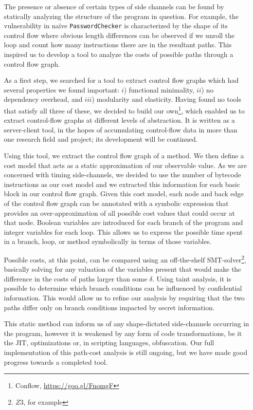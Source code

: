 The presence or absence of certain types of side channels can be found by 
statically analyzing the structure of the program in question. For example, the vulnerability in na\"ive \texttt{PasswordChecker} is characterized by the shape of its control flow where obvious length
differences can be observed if we unroll the loop and count how many instructions there are in the resultant
paths. This inspired us to develop a tool to analyze the costs of possible paths through a control flow graph. 

As a first step, we searched for a tool to extract control flow graphs which had several properties we found important: $i$) functional minimality, $ii$) no dependency overhead, and $iii$) modularity and elasticity. Having found no tools that satisfy all three of these, we decided to build our own\footnote{Conflow, \href{https://goo.gl/FnomgF}{https://goo.gl/FnomgF}}, which enabled us to extract control-flow graphs at different levels of abstraction. It is written as a server-client tool, in the hopes of accumulating control-flow data in more than one research field and project; its development will be continued.

Using this tool, we extract the control flow graph of a method. We then define a cost model that acts as a static approximation of our observable value. As we are concerned with timing side-channels, we decided to use the number of bytecode instructions as our cost model and we extracted this information for each basic block in our control flow graph. Given this cost model, each node and back edge of the control flow graph can be annotated with a symbolic expression that provides an over-approximation of all possible cost values that could occur at that node. Boolean variables are introduced for each branch of the program and integer variables for each loop. This allows us to express the possible time spent in a branch, loop, or method symbolically in terms of those variables. 

Possible costs, at this point, can be compared using an off-the-shelf SMT-solver\footnote{$Z3$, for example}, basically solving for any valuation of the variables present that would make the difference in the costs of paths larger than some $\delta$. Using taint analysis, it is possible to determine which branch conditions can be influenced by confidential information. This would allow us to refine our analysis by requiring that the two paths differ only on branch conditions impacted by secret information. 

This static method can inform us of any shape-dictated side-channels occurring in the program, however it is weakened by any form of code transformations, be it the JIT, optimizations or, in scripting languages, obfuscation. Our full implementation of this path-cost analysis is still ongoing, but we have made good progress towards a completed tool. 



